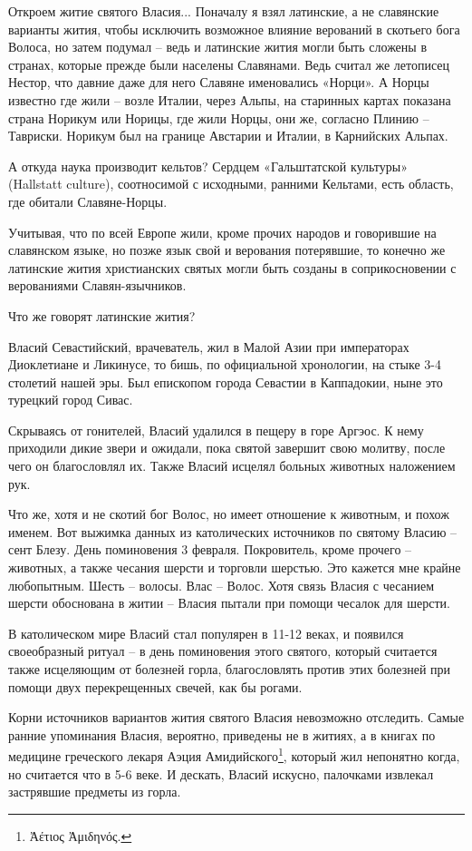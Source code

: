\documentclass[a5paper,11pt,openany]{article}
\begin{document}
    Откроем житие святого Власия... Поначалу я взял латинские, а не славянские варианты жития, чтобы исключить возможное влияние верований в скотьего бога Волоса, но затем подумал – ведь и латинские жития могли быть сложены в странах, которые прежде были населены Славянами. Ведь считал же летописец Нестор, что давние даже для него Славяне именовались «Норци». А Норцы известно где жили – возле Италии, через Альпы, на старинных картах показана страна Норикум или Норицы, где жили Норцы, они же, согласно Плинию – Тавриски. Норикум был на границе Австарии и Италии, в Карнийских Альпах. 

   А откуда наука производит кельтов? Сердцем «Гальштатской культуры» (Hallstatt
culture), соотносимой с исходными, ранними Кельтами, есть область, где обитали Славяне-Норцы.

   Учитывая, что по всей Европе жили, кроме прочих народов и говорившие на славянском языке, но позже язык свой и верования потерявшие, то конечно же латинские жития христианских святых могли быть созданы в соприкосновении с верованиями Славян-язычников.

 Что же говорят латинские жития?

   Власий Севастийский, врачеватель, жил в Малой Азии при императорах Диоклетиане и Ликинусе, то бишь, по официальной хронологии, на стыке 3-4 столетий нашей эры. Был епископом города Севастии в Каппадокии, ныне это турецкий город Сивас.

  Скрываясь от гонителей, Власий удалился в пещеру в горе Аргэос. К нему приходили дикие звери и ожидали, пока святой завершит свою молитву, после чего он благословлял их. Также Власий исцелял больных животных наложением рук.

  Что же, хотя и не скотий бог Волос, но имеет отношение к животным, и похож именем. Вот выжимка данных из католических источников по святому Власию – сент Блезу. День поминовения 3 февраля. Покровитель, кроме прочего – животных, а также чесания шерсти и торговли шерстью. Это кажется мне крайне любопытным. Шесть – волосы. Влас – Волос. Хотя связь Власия с чесанием шерсти обоснована в житии – Власия пытали при помощи чесалок для шерсти.

   В католическом мире Власий стал популярен в 11-12 веках, и появился своеобразный ритуал – в день поминовения этого святого, который считается также исцеляющим от болезней горла, благословлять против этих болезней при помощи двух перекрещенных свечей, как бы рогами.

   Корни источников вариантов жития святого Власия невозможно отследить. Самые ранние упоминания Власия, вероятно, приведены не в житиях, а в книгах по медицине греческого лекаря Аэция Амидийского\footnote{Ἀέτιος Ἀμιδηνός.}, который жил непонятно когда, но считается что в 5-6 веке. И дескать, Власий искусно, палочками извлекал застрявшие предметы из горла. 
\end{document}

